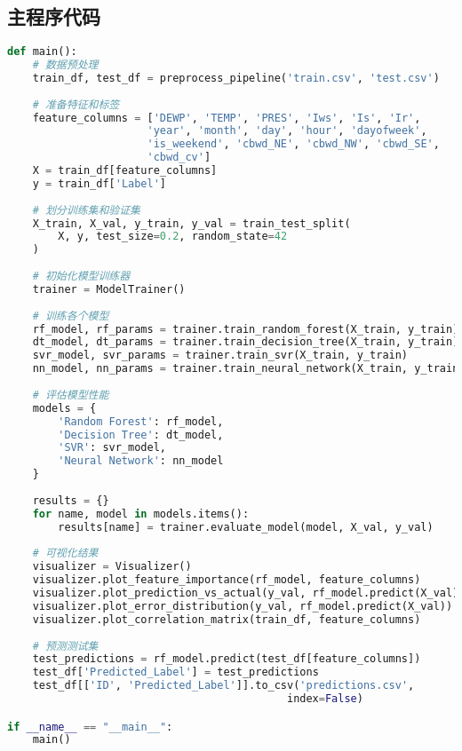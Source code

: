 \subsection{主程序代码}
\begin{lstlisting}[language=Python, caption=主程序实现, label=lst:main]
def main():
    # 数据预处理
    train_df, test_df = preprocess_pipeline('train.csv', 'test.csv')
    
    # 准备特征和标签
    feature_columns = ['DEWP', 'TEMP', 'PRES', 'Iws', 'Is', 'Ir',
                      'year', 'month', 'day', 'hour', 'dayofweek', 
                      'is_weekend', 'cbwd_NE', 'cbwd_NW', 'cbwd_SE', 
                      'cbwd_cv']
    X = train_df[feature_columns]
    y = train_df['Label']
    
    # 划分训练集和验证集
    X_train, X_val, y_train, y_val = train_test_split(
        X, y, test_size=0.2, random_state=42
    )
    
    # 初始化模型训练器
    trainer = ModelTrainer()
    
    # 训练各个模型
    rf_model, rf_params = trainer.train_random_forest(X_train, y_train)
    dt_model, dt_params = trainer.train_decision_tree(X_train, y_train)
    svr_model, svr_params = trainer.train_svr(X_train, y_train)
    nn_model, nn_params = trainer.train_neural_network(X_train, y_train)
    
    # 评估模型性能
    models = {
        'Random Forest': rf_model,
        'Decision Tree': dt_model,
        'SVR': svr_model,
        'Neural Network': nn_model
    }
    
    results = {}
    for name, model in models.items():
        results[name] = trainer.evaluate_model(model, X_val, y_val)
    
    # 可视化结果
    visualizer = Visualizer()
    visualizer.plot_feature_importance(rf_model, feature_columns)
    visualizer.plot_prediction_vs_actual(y_val, rf_model.predict(X_val))
    visualizer.plot_error_distribution(y_val, rf_model.predict(X_val))
    visualizer.plot_correlation_matrix(train_df, feature_columns)
    
    # 预测测试集
    test_predictions = rf_model.predict(test_df[feature_columns])
    test_df['Predicted_Label'] = test_predictions
    test_df[['ID', 'Predicted_Label']].to_csv('predictions.csv', 
                                            index=False)

if __name__ == "__main__":
    main()
\end{lstlisting} 